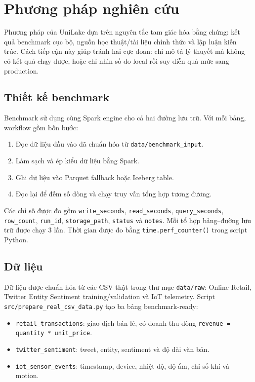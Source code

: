 \section{Phương pháp nghiên cứu}

Phương pháp của UniLake dựa trên nguyên tắc tam giác hóa bằng chứng: kết quả benchmark cục bộ, nguồn học thuật/tài liệu chính thức và lập luận kiến trúc. Cách tiếp cận này giúp tránh hai cực đoan: chỉ mô tả lý thuyết mà không có kết quả chạy được, hoặc chỉ nhìn số đo local rồi suy diễn quá mức sang production.

\subsection{Thiết kế benchmark}

Benchmark sử dụng cùng Spark engine cho cả hai đường lưu trữ. Với mỗi bảng, workflow gồm bốn bước:

\begin{enumerate}
\item Đọc dữ liệu đầu vào đã chuẩn hóa từ \texttt{data/benchmark\_input}.
\item Làm sạch và ép kiểu dữ liệu bằng Spark.
\item Ghi dữ liệu vào Parquet fallback hoặc Iceberg table.
\item Đọc lại để đếm số dòng và chạy truy vấn tổng hợp tương đương.
\end{enumerate}

Các chỉ số được đo gồm \texttt{write\_seconds}, \texttt{read\_seconds}, \texttt{query\_seconds}, \texttt{row\_count}, \texttt{run\_id}, \texttt{storage\_path}, \texttt{status} và \texttt{notes}. Mỗi tổ hợp bảng--đường lưu trữ được chạy 3 lần. Thời gian được đo bằng \texttt{time.perf\_counter()} trong script Python.

\subsection{Dữ liệu}

Dữ liệu được chuẩn hóa từ các CSV thật trong thư mục \texttt{data/raw}: Online Retail, Twitter Entity Sentiment training/validation và IoT telemetry. Script \texttt{src/prepare\_real\_csv\_data.py} tạo ba bảng benchmark-ready:

\begin{itemize}
\item \texttt{retail\_transactions}: giao dịch bán lẻ, có doanh thu dòng \texttt{revenue = quantity * unit\_price}.
\item \texttt{twitter\_sentiment}: tweet, entity, sentiment và độ dài văn bản.
\item \texttt{iot\_sensor\_events}: timestamp, device, nhiệt độ, độ ẩm, chỉ số khí và motion.
\end{itemize}

